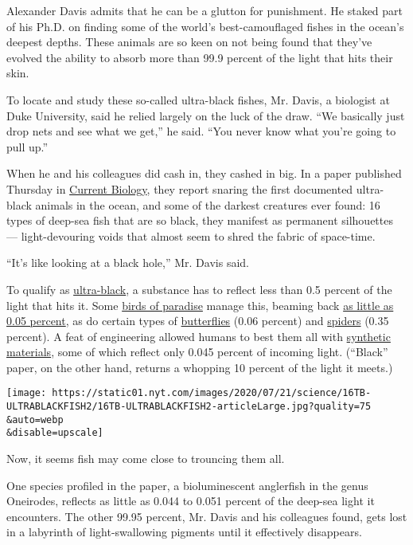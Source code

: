 Alexander Davis admits that he can be a glutton for punishment. He
staked part of his Ph.D. on finding some of the world's best-camouflaged
fishes in the ocean's deepest depths. These animals are so keen on not
being found that they've evolved the ability to absorb more than 99.9
percent of the light that hits their skin.

To locate and study these so-called ultra-black fishes, Mr. Davis, a
biologist at Duke University, said he relied largely on the luck of the
draw. ``We basically just drop nets and see what we get,'' he said.
``You never know what you're going to pull up.''

When he and his colleagues did cash in, they cashed in big. In a paper
published Thursday in
\href{http://dx.doi.org/10.1016/j.cub.2020.06.044}{Current Biology},
they report snaring the first documented ultra-black animals in the
ocean, and some of the darkest creatures ever found: 16 types of
deep-sea fish that are so black, they manifest as permanent silhouettes
--- light-devouring voids that almost seem to shred the fabric of
space-time.

``It's like looking at a black hole,'' Mr. Davis said.

To qualify as
\href{https://www.nytimes.com/2019/11/11/science/black-fashion-physics-animals.html}{ultra-black},
a substance has to reflect less than 0.5 percent of the light that hits
it. Some
\href{https://cdn.mos.cms.futurecdn.net/qpDcS5xokG7zrWesXcXd8V.jpg}{birds
of paradise} manage this, beaming back
\href{https://www.nature.com/articles/s41467-017-02088-w}{as little as
0.05 percent}, as do certain types of
\href{https://www.nature.com/articles/s41467-020-15033-1}{butterflies}
(0.06 percent) and
\href{https://royalsocietypublishing.org/doi/10.1098/rspb.2019.0589}{spiders}
(0.35 percent). A feat of engineering allowed humans to best them all
with \href{https://www.pnas.org/content/106/15/6044}{synthetic
materials}, some of which reflect only 0.045 percent of incoming light.
(``Black'' paper, on the other hand, returns a whopping 10 percent of
the light it meets.)

\texttt{[image: https://static01.nyt.com/images/2020/07/21/science/16TB-ULTRABLACKFISH2/16TB-ULTRABLACKFISH2-articleLarge.jpg?quality=75\\\&auto=webp\\\&disable=upscale]}

Now, it seems fish may come close to trouncing them all.

One species profiled in the paper, a bioluminescent anglerfish in the
genus Oneirodes, reflects as little as 0.044 to 0.051 percent of the
deep-sea light it encounters. The other 99.95 percent, Mr. Davis and his
colleagues found, gets lost in a labyrinth of light-swallowing pigments
until it effectively disappears.

